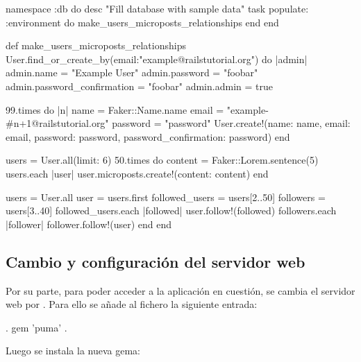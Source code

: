 \begin{codelisting}
\label{code:idempotentseed}
\begin{code}
namespace :db do
  desc "Fill database with sample data"
  task populate: :environment do
    make_users_microposts_relationships
  end
end

def make_users_microposts_relationships
  User.find_or_create_by(email:"example@railstutorial.org") do |admin| 
  	admin.name = "Example User"
	admin.password = "foobar"
        admin.password_confirmation = "foobar"
        admin.admin = true

	99.times do |n|
	    name  = Faker::Name.name
	    email = "example-#{n+1}@railstutorial.org"
	    password  = "password"
	    User.create!(name:     name,
                 email:    email,
                 password: password,
                 password_confirmation: password)
        end

	users = User.all(limit: 6)
  	50.times do
	    content = Faker::Lorem.sentence(5)
	    users.each { |user| user.microposts.create!(content: content) }
	end  

	users = User.all
	user  = users.first
	followed_users = users[2..50]
	followers      = users[3..40]
	followed_users.each { |followed| user.follow!(followed) }
	followers.each      { |follower| follower.follow!(user) }
  end
end
\end{code}
\end{codelisting}

\subsection{Cambio y configuración del servidor web}

Por su parte, para poder acceder a la aplicación en cuestión, se cambia el servidor web  por . Para ello se añade al fichero  la siguiente entrada:

\begin{codelisting}
\label{code:addpuma}
\begin{code}
.
gem 'puma'
.
\end{code}
\end{codelisting}

Luego se instala la nueva gema: 


